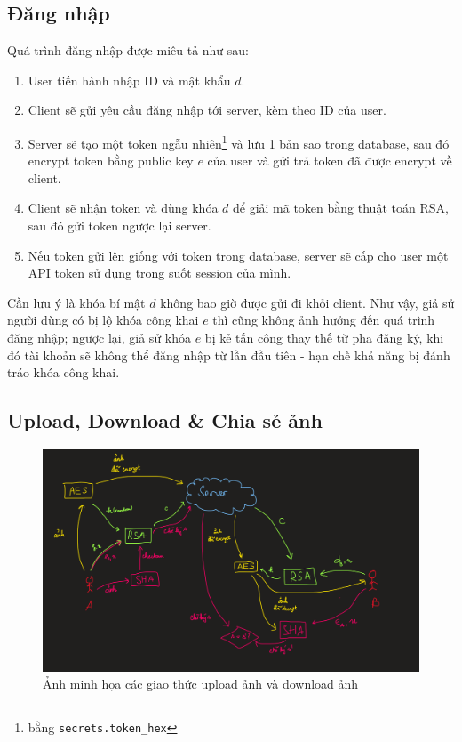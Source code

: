 \documentclass[12pt]{article}
\begin{document}
\subsection{Đăng nhập}
Quá trình đăng nhập được miêu tả như sau:
\begin{enumerate}
\item User tiến hành nhập ID và mật khẩu $d$.
\item Client sẽ gửi yêu cầu đăng nhập tới server, kèm theo ID của user.
\item Server sẽ tạo một token ngẫu nhiên\footnote{bằng \texttt{secrets.token\_hex}} và lưu 1 bản sao trong database, sau đó encrypt token bằng public key $e$ của user và gửi trả token đã được encrypt về client.
\item Client sẽ nhận token và dùng khóa $d$ để giải mã token bằng thuật toán RSA, sau đó gửi token ngược lại server.
\item Nếu token gửi lên giống với token trong database, server sẽ cấp cho user một API token sử dụng trong suốt session của mình.
\end{enumerate}
Cần lưu ý là khóa bí mật $d$ không bao giờ được gửi đi khỏi client. Như vậy, giả sử người dùng có bị lộ khóa công khai $e$ thì cũng không ảnh hưởng đến quá trình đăng nhập; ngược lại, giả sử khóa $e$ bị kẻ tấn công thay thế từ pha đăng ký, khi đó tài khoản sẽ không thể đăng nhập từ lần đầu tiên - hạn chế khả năng bị đánh tráo khóa công khai.

\subsection{Upload, Download \& Chia sẻ ảnh}
\begin{figure}[H]
\centering
\includegraphics[scale=0.75]{upload-protocol.png}
\caption{Ảnh minh họa các giao thức upload ảnh và download ảnh}
\end{figure}
\end{document}
